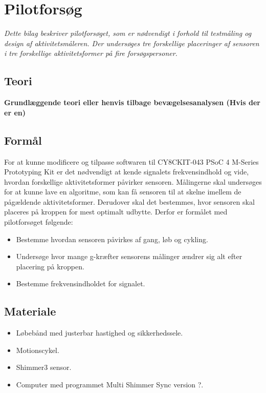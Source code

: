 \chapter{Pilotforsøg}\vspace{-.75cm}
\textit{Dette bilag beskriver pilotforsøget, som er nødvendigt i forhold til testmåling og design af aktivitetsmåleren. Der undersøges tre forskellige placeringer af sensoren i tre forskellige aktivitetsformer på fire forsøgspersoner.}

\section{Teori}
\textbf{Grundlæggende teori eller henvis tilbage bevægelsesanalysen (Hvis der er en)}

\section{Formål}
For at kunne modificere og tilpasse softwaren til CY8CKIT-043 PSoC 4 M-Series Prototyping Kit er det nødvendigt at kende signalets frekvensindhold og vide, hvordan forskellige aktivitetsformer påvirker sensoren. Målingerne skal undersøges for at kunne lave en algoritme, som kan få sensoren til at skelne imellem de pågældende aktivitetsformer. Derudover skal det bestemmes, hvor sensoren skal placeres på kroppen for mest optimalt udbytte. Derfor er formålet med pilotforsøget følgende:
\begin{itemize}
	\item Bestemme hvordan sensoren påvirkes af gang, løb og cykling.
	\item Undersøge hvor mange g-kræfter sensorens målinger ændrer sig alt efter placering på kroppen.
	\item Bestemme frekvensindholdet for signalet.
\end{itemize}

\section{Materiale}
\begin{itemize}
	\item Løbebånd med justerbar hastighed og sikkerhedssele.
	\item Motionscykel.
	\item Shimmer3 sensor.
	\item Computer med programmet Multi Shimmer Sync version ?.
\end{itemize}


